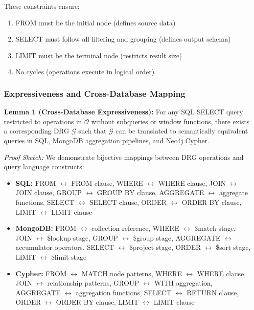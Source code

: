 \documentclass[conference]{IEEEtran}
\begin{document}
These constraints ensure:
\begin{enumerate}
\item FROM must be the initial node (defines source data)
\item SELECT must follow all filtering and grouping (defines output schema)
\item LIMIT must be the terminal node (restricts result size)
\item No cycles (operations execute in logical order)
\end{enumerate}

\subsubsection{Expressiveness and Cross-Database Mapping}

\textbf{Lemma 1 (Cross-Database Expressiveness):} For any SQL SELECT query restricted to operations in $\mathcal{O}$ without subqueries or window functions, there exists a corresponding DRG $\mathcal{G}$ such that $\mathcal{G}$ can be translated to semantically equivalent queries in SQL, MongoDB aggregation pipelines, and Neo4j Cypher.

\textit{Proof Sketch:} We demonstrate bijective mappings between DRG operations and query language constructs:
\begin{itemize}
\item \textbf{SQL:} FROM $\leftrightarrow$ FROM clause, WHERE $\leftrightarrow$ WHERE clause, JOIN $\leftrightarrow$ JOIN clause, GROUP $\leftrightarrow$ GROUP BY clause, AGGREGATE $\leftrightarrow$ aggregate functions, SELECT $\leftrightarrow$ SELECT clause, ORDER $\leftrightarrow$ ORDER BY clause, LIMIT $\leftrightarrow$ LIMIT clause

\item \textbf{MongoDB:} FROM $\leftrightarrow$ collection reference, WHERE $\leftrightarrow$ \$match stage, JOIN $\leftrightarrow$ \$lookup stage, GROUP $\leftrightarrow$ \$group stage, AGGREGATE $\leftrightarrow$ accumulator operators, SELECT $\leftrightarrow$ \$project stage, ORDER $\leftrightarrow$ \$sort stage, LIMIT $\leftrightarrow$ \$limit stage

\item \textbf{Cypher:} FROM $\leftrightarrow$ MATCH node patterns, WHERE $\leftrightarrow$ WHERE clause, JOIN $\leftrightarrow$ relationship patterns, GROUP $\leftrightarrow$ WITH aggregation, AGGREGATE $\leftrightarrow$ aggregation functions, SELECT $\leftrightarrow$ RETURN clause, ORDER $\leftrightarrow$ ORDER BY clause, LIMIT $\leftrightarrow$ LIMIT clause
\end{itemize}
\end{document}
